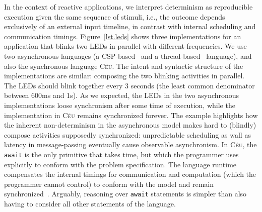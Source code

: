 \documentclass{acm_proc_article-sp}
\newcommand{\CEU}{\textsc{C\'{e}u}\xspace}
\newcommand{\code}[1] {{\small{\texttt{#1}}}}
\newcommand{\1}{\;}
\newcommand{\2}{\;\;}
\newcommand{\3}{\;\;\;}
\newcommand{\5}{\;\;\;\;\;}
\begin{document}
In the context of reactive applications, we interpret determinism as 
reproducible execution given the same sequence of stimuli, i.e., the outcome 
depends exclusively of an external input timeline, in contrast with internal 
scheduling and communication timings.
%
Figure~\ref{lst.leds} shows three implementations for an application that 
blinks two LEDs in parallel with different frequencies.
We use two asynchronous languages (a CSP-based~\cite{arduino.occam} and a 
thread-based~\cite{arduino.chibios} language), and also the synchronous 
language \CEU.
%
The intent and syntactic structure of the implementations are similar:
composing the two blinking activities in parallel.
%
The LEDs should blink together every 3 seconds (the least common denominator 
between 600ms and 1s).
%
As we expected, the LEDs in the two asynchronous implementations loose 
synchronism after some time of execution, while the implementation in \CEU 
remains synchronized forever.
%
The example highlights how the inherent non-determinism in the asynchronous 
model makes hard to (blindly) compose activities supposedly synchronized: 
unpredictable scheduling as wall as latency in message-passing eventually cause 
observable asynchronism.
%
In \CEU, the \code{await} is the only primitive that takes time, but which the 
programmer uses explicitly to conform with the problem specification.
The language runtime compensates the internal timings for communication and 
computation (which the programmer cannot control) to conform with the model and 
remain synchronized~\cite{ceu.sensys13}.
%
Arguably, reasoning over \code{await} statements is simpler than also having to 
consider all other statements of the language.
\end{document}
